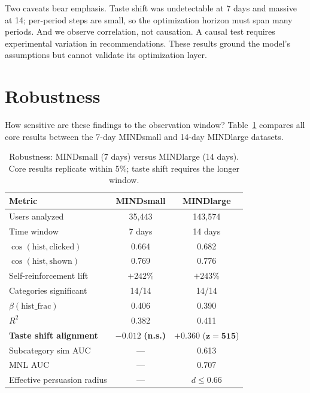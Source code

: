 \documentclass[11pt]{article}
\begin{document}
Two caveats bear emphasis. Taste shift was undetectable at 7 days and massive at 14; per-period steps are small, so the optimization horizon must span many periods. And we observe correlation, not causation. A causal test requires experimental variation in recommendations. These results ground the model's assumptions but cannot validate its optimization layer.


\section{Robustness}

How sensitive are these findings to the observation window? Table~\ref{tab:robustness} compares all core results between the 7-day MINDsmall and 14-day MINDlarge datasets.

\begin{table}[ht]
\centering
\caption{Robustness: MINDsmall (7 days) versus MINDlarge (14 days). Core results replicate within 5\%; taste shift requires the longer window.}
\label{tab:robustness}
\begin{tabular}{lcc}
\toprule
Metric & MINDsmall & MINDlarge \\
\midrule
Users analyzed & 35,443 & 143,574 \\
Time window & 7 days & 14 days \\
$\cos(\text{hist}, \text{clicked})$ & 0.664 & 0.682 \\
$\cos(\text{hist}, \text{shown})$ & 0.769 & 0.776 \\
Self-reinforcement lift & $+242\%$ & $+243\%$ \\
Categories significant & 14/14 & 14/14 \\
$\beta(\text{hist\_frac})$ & 0.406 & 0.390 \\
$R^2$ & 0.382 & 0.411 \\
\textbf{Taste shift alignment} & $\boldsymbol{-0.012}$ \textbf{(n.s.)} & $\boldsymbol{+0.360}$ ($\boldsymbol{z = 515}$) \\
Subcategory sim AUC & --- & 0.613 \\
MNL AUC & --- & 0.707 \\
Effective persuasion radius & --- & $d \leq 0.66$ \\
\bottomrule
\end{tabular}
\end{table}
\FloatBarrier
\end{document}

